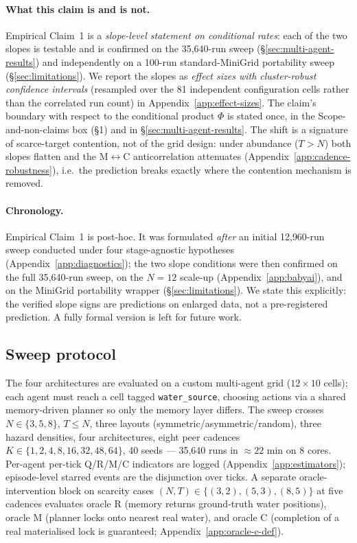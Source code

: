 \documentclass{article}
\begin{document}
\paragraph{What this claim is and is not.}
Empirical Claim~1 is a \emph{slope-level statement on conditional rates}: each of the two slopes is testable and is confirmed on the 35{,}640-run sweep (\S\ref{sec:multi-agent-results}) and independently on a 100-run standard-MiniGrid portability sweep (\S\ref{sec:limitations}). We report the slopes as \emph{effect sizes with cluster-robust confidence intervals} (resampled over the 81 independent configuration cells rather than the correlated run count) in Appendix~\ref{app:effect-sizes}. The claim's boundary with respect to the conditional product $\Phi$ is stated once, in the Scope-and-non-claims box (\S1) and in \S\ref{sec:multi-agent-results}. The shift is a signature of scarce-target contention, not of the grid design: under abundance ($T{>}N$) both slopes flatten and the M$\leftrightarrow$C anticorrelation attenuates (Appendix~\ref{app:cadence-robustness}), i.e.\ the prediction breaks exactly where the contention mechanism is removed.

\paragraph{Chronology.}
Empirical Claim~1 is post-hoc. It was formulated \emph{after} an initial 12{,}960-run sweep conducted under four stage-agnostic hypotheses (Appendix~\ref{app:diagnostics}); the two slope conditions were then confirmed on the full 35{,}640-run sweep, on the $N\!=\!12$ scale-up (Appendix~\ref{app:babyai}), and on the MiniGrid portability wrapper (\S\ref{sec:limitations}). We state this explicitly: the verified slope signs are predictions on enlarged data, not a pre-registered
prediction. A fully formal version is left for future work.

\subsection{Sweep protocol}
\label{sec:multi-agent-protocol}

The four architectures are evaluated on a custom multi-agent grid ($12{\times}10$ cells); each agent must reach a cell tagged \texttt{water\_source}, choosing actions via a shared memory-driven planner so only the memory layer differs. The sweep crosses $N{\in}\{3,5,8\}$, $T{\le}N$, three layouts (symmetric/asymmetric/random), three hazard densities, four architectures, eight peer cadences $K{\in}\{1,2,4,8,16,32,48,64\}$, 40 seeds --- 35{,}640 runs in $\approx 22$ min on 8 cores. Per-agent per-tick Q/R/M/C indicators are logged (Appendix~\ref{app:estimators}); episode-level starred events are the disjunction over ticks. A separate oracle-intervention block on scarcity cases $(N,T){\in}\{(3,2),(5,3),(8,5)\}$ at five cadences evaluates oracle R (memory returns ground-truth water positions), oracle M (planner locks onto nearest real water), and oracle C (completion of a real materialised lock is guaranteed; Appendix~\ref{app:oracle-c-def}).
\end{document}
